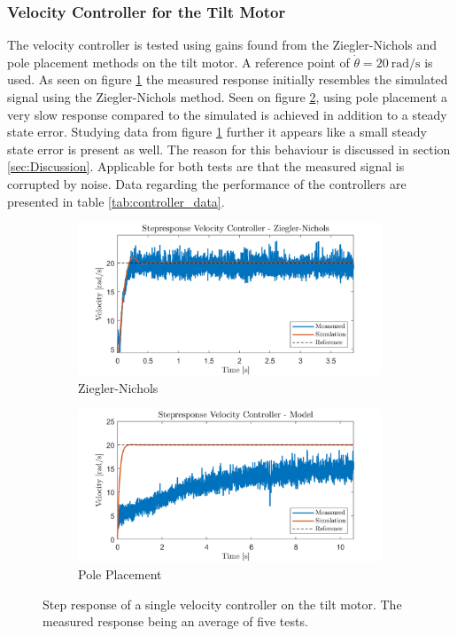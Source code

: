 \documentclass[../../main.tex]{subfiles}
\begin{document}
\subsubsection*{Velocity Controller for the Tilt Motor}
The velocity controller is tested using gains found from the Ziegler-Nichols and pole placement methods on the tilt motor. A reference point of $\Dot{\theta}=\SI{20}{\radian \per \second}$ is used. As seen on figure \ref{fig:StepVelZN} the measured response initially resembles the simulated signal using the Ziegler-Nichols method. Seen on figure \ref{fig:StepVelModel}, using pole placement a very slow response compared to the simulated is achieved in addition to a steady state error. Studying data from figure \ref{fig:StepVelZN} further it appears like a small steady state error is present as well. The reason for this behaviour is discussed in section \ref{sec:Discussion}. Applicable for both tests are that the measured signal is corrupted by noise. Data regarding the performance of the controllers are presented in table \ref{tab:controller_data}.

\begin{figure}[h]
     \centering
     \begin{subfigure}[b]{0.49\textwidth}
         \centering
         \includegraphics[width=\textwidth]{Sections/Test/Images/StepVelocityZN.png}
         \caption{Ziegler-Nichols}
         \label{fig:StepVelZN}
     \end{subfigure}
     \hfill
     \begin{subfigure}[b]{0.49\textwidth}
         \centering
         \includegraphics[width=\textwidth]{Sections/Test/Images/StepVelocityModel.png}
         \caption{Pole Placement}
         \label{fig:StepVelModel}
     \end{subfigure}
        \caption{Step response of a single velocity controller on the tilt motor. The measured response being an average of five tests.}
        \label{fig:VelocityTilt}
\end{figure}
\end{document}
